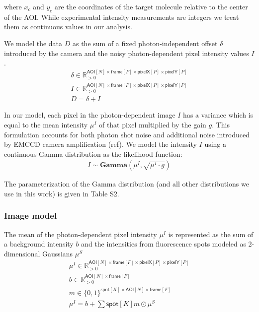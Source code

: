 \noindent
where $x_c$ and $y_c$ are the coordinates of the target molecule relative to the center of the AOI. While experimental intensity measurements are integers we treat them as continuous values in our analysis.

We model the data $D$ as the sum of a fixed photon-independent offset $\delta$ introduced by the camera and the noisy photon-dependent pixel intensity values $I$.
%
\begin{gather*}
    \delta \in \mathbb{R}_{>0}^{\mathsf{AOI}[N] \times \mathsf{frame}[F] \times \mathsf{pixelX}[P] \times \mathsf{pixelY}[P]} \\
    I \in \mathbb{R}_{>0}^{\mathsf{AOI}[N] \times \mathsf{frame}[F] \times \mathsf{pixelX}[P] \times \mathsf{pixelY}[P]} \\ 
    D = \delta + I
\end{gather*}

In our model, each pixel in the photon-dependent image $I$ has a  variance which is equal to  the mean intensity $\mu^I$ of that pixel multiplied by the gain $g$. This formulation accounts for both photon shot noise and additional noise introduced by EMCCD camera amplification (ref). We model the intensity $I$ using a continuous Gamma distribution as the likelihood function:
%
\begin{gather*}
    I \sim \mathbf{Gamma} (\mu^I, \sqrt{\mu^I \cdot g})
\end{gather*}

The parameterization of the Gamma distribution (and all other distributions we use in this work) is given in Table S2.

\subsubsection*{Image model}

The mean of the photon-dependent pixel intensity $\mu^I$ is represented  as the sum of a background intensity $b$ and the intensities from fluorescence spots modeled as  2-dimensional Gaussians $\mu^S$ 
%
\begin{gather*}
    \mu^I \in \mathbb{R}_{>0}^{\mathsf{AOI}[N] \times \mathsf{frame}[F] \times \mathsf{pixelX}[P] \times \mathsf{pixelY}[P]} \\
    b \in \mathbb{R}_{>0}^{\mathsf{AOI}[N] \times \mathsf{frame}[F]} \\
    m \in \{ 0, 1 \}^{\mathrm{spot}[K] \times \mathsf{AOI}[N] \times \mathsf{frame}[F] } \\
    \mu^I = b + \sum{\mathsf{spot}[K]} m \odot{} \mu^S \\
\end{gather*}

